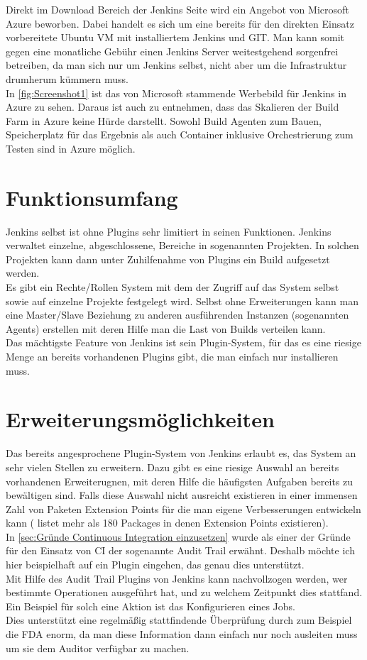 Direkt im Download Bereich der Jenkins Seite wird ein Angebot von Microsoft Azure beworben. Dabei handelt es sich um eine bereits für den direkten Einsatz vorbereitete Ubuntu VM mit installiertem Jenkins und GIT. Man kann somit gegen eine monatliche Gebühr einen Jenkins Server weitestgehend sorgenfrei betreiben, da man sich nur um Jenkins selbst, nicht aber um die Infrastruktur drumherum kümmern muss. \cite{jenkins-azure}\\
In \autoref{fig:Screenshot1} ist das von Microsoft stammende Werbebild für Jenkins in Azure zu sehen. Daraus ist auch zu entnehmen, dass das Skalieren der Build Farm in Azure keine Hürde darstellt. Sowohl Build Agenten zum Bauen, Speicherplatz für das Ergebnis als auch Container inklusive Orchestrierung zum Testen sind in Azure möglich.
\section{Funktionsumfang}
Jenkins selbst ist ohne Plugins sehr limitiert in seinen Funktionen. Jenkins verwaltet einzelne, abgeschlossene, Bereiche in sogenannten Projekten. In solchen Projekten kann dann unter Zuhilfenahme von Plugins ein Build aufgesetzt werden.\\
Es gibt ein Rechte/Rollen System mit dem der Zugriff auf das System selbst sowie auf einzelne Projekte festgelegt wird. Selbst ohne Erweiterungen kann man eine Master/Slave Beziehung zu anderen ausführenden Instanzen (sogenannten Agents) erstellen mit deren Hilfe man die Last von Builds verteilen kann.\\
Das mächtigste Feature von Jenkins ist sein Plugin-System, für das es eine riesige Menge an bereits vorhandenen Plugins gibt, die man einfach nur installieren muss.
\section{Erweiterungsmöglichkeiten}
Das bereits angesprochene Plugin-System von Jenkins erlaubt es, das System an sehr vielen Stellen zu erweitern. Dazu gibt es eine riesige Auswahl an bereits vorhandenen Erweiterugnen, mit deren Hilfe die häufigsten Aufgaben bereits zu bewältigen sind. Falls diese Auswahl nicht ausreicht existieren in einer immensen Zahl von Paketen Extension Points für die man eigene Verbesserungen entwickeln kann (\cite{jenkins-extensionpoints} listet mehr als 180 Packages in denen Extension Points existieren).\\
In \autoref{sec:Gründe Continuous Integration einzusetzen} wurde als einer der Gründe für den Einsatz von CI der sogenannte Audit Trail erwähnt. Deshalb möchte ich hier beispielhaft auf ein Plugin eingehen, das genau dies unterstützt.\\
Mit Hilfe des Audit Trail Plugins von Jenkins kann nachvollzogen werden, wer bestimmte Operationen ausgeführt hat, und zu welchem Zeitpunkt dies stattfand. Ein Beispiel für solch eine Aktion ist das Konfigurieren eines Jobs. \cite{jenkins-audit-trail}\\
Dies unterstützt eine regelmäßig stattfindende Überprüfung durch zum Beispiel die FDA enorm, da man diese Information dann einfach nur noch ausleiten muss um sie dem Auditor verfügbar zu machen.
